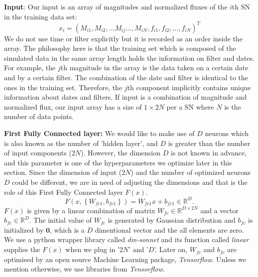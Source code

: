 \documentclass[proof]{pasj01}
\begin{document}
{\bf Input}: Our input is an array of magnitudes and normalized fluxes of the $i$th SN in the training data set:
\begin{equation}
      x_i = \left( M_{i1}, M_{i2}, \ldots M_{ij} \ldots , M_{iN}, f_{i1}, f_{i2}, \ldots, f_{iN} \right)^T
\end{equation}
We do not use time or filter explicitly but it is recorded as an order inside the array.  The philosophy here is that the training set which is composed of the simulated data in the same array length holds the information on filter and dates.  For example, the $j$th magnitude in the array is the data taken on a certain date and by a certain filter.  The combination of the date and filter is identical to the ones in the training set.  Therefore, the $j$th component implicitly contains unique information about dates and filters.  
If input is a combination of magnitude and normalized flux,
our input array has a size of $1\times2N$ per a SN where $N$ is the number of data points.


{\bf First Fully Connected layer:}
We would like to make use of $D$ neurons which is also known as the number of 'hidden layer', and $D$ is greater than the number of input components ($2N$).  However, the dimension $D$ is not known in advance, and this parameter is one of the hyperparameters we optimize later in this section.  Since the dimension of input ($2N$) and the number of optimized neurons $D$ could be different, we are in need of adjusting the dimensions and that is the role of this First Fully Connected layer $F(x)$.    
\begin{equation}
    F \left(x, \left\{W_{fc1},b_{fc1}\right\}\right) = W_{fc1} x + b_{fc1} \in \mathbb{R}^D.
\end{equation}
$F(x)$ is given by a linear combination of matrix $W_{fc} \in \mathbb{R}^{D\times 2N}$ and a vector $b_{fc} \in \mathbb{R}^D$. The initial value of $W_{fc}$ is generated by Gaussian distribution and $b_{fc}$ is initialized by $\mathbf{0}$, which is a $D$ dimentional vector and the all elements are zero.  We use a python wrapper library called {\it dm-sonnet} and its function called {\it linear} supplies the $F(x)$ when we plug in '$2N$' and '$D$'.  
Later on, $W_{fc}$ and $b_{fc}$ are optimised by an open source Machine Learning package, {\it Tensorflow}.  Unless we mention otherwise, we use libraries from {\it Tensorflow}.
\end{document}
